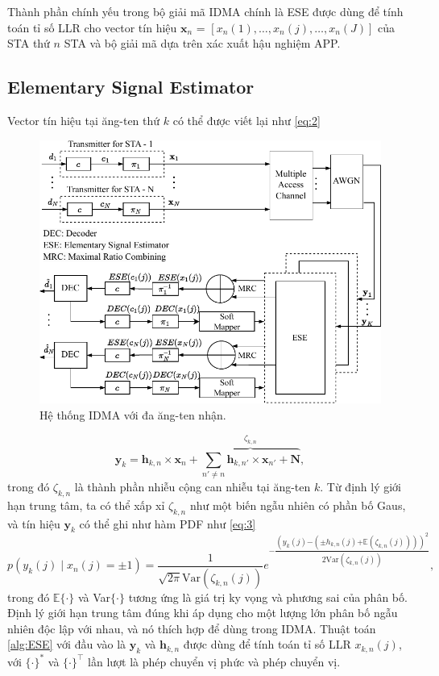 Thành phần chính yếu trong bộ giải mã IDMA chính là \acrfull{ESE} được dùng để tính toán tỉ số \acrfull{LLR} cho vector tín hiệu $\mathbf{x}_n $ = $[x_n(1),\dots,x_n(j),\dots,x_n(J)]$ của STA thứ $n$ STA và bộ giải mã dựa trên xác xuất hậu nghiệm \acrfull{APP}.

\subsection{Elementary Signal Estimator} \label{sub2.1}

Vector tín hiệu tại ăng-ten thứ $k$ có thể được viết lại như \eqref{eq:2}

\begin{figure}
    \centering
    \includegraphics[width = 0.75\linewidth]{figure/Chap2/IDMA_Tx_Rx_structure-2_k2opt.pdf}
    \caption{Hệ thống IDMA với đa ăng-ten nhận.}
    \vspace{-1em}
    \label{fig:IDMASystem}
\end{figure}

\begin{equation}
    \mathbf{y}_k = \mathbf{h}_{k,n} \times \mathbf{x}_n 
    + \overbrace{\sum_{n' \neq n}\mathbf{h}_{k,n'} \times \mathbf{x}_{n'} 
    + \mathbf{N}}^{\zeta_{k,n}},
    \label{eq:2}
\end{equation}%
trong đó $\zeta_{k,n}$ là thành phần nhiễu cộng can nhiễu tại ăng-ten $k$. Từ định lý giới hạn trung tâm, ta có thể xấp xỉ $\zeta_{k,n}$ như một biến ngẫu nhiên có phần bố Gaus, và tín hiệu $\mathbf{y}_k$ có thể ghi như hàm PDF như \eqref{eq:3}
\begin{equation}
         p(y_k(j)\mid x_n(j)=\pm 1) = 
         \frac{1}{\sqrt{2\pi}\text{Var}(\zeta_{k,n}(j))} 
        e^{\mathord{-}\dfrac{(y_k(j)\mathord{-}(\pm h_{k,n}(j)\mathord{+}\mathbb{E}(\zeta_{k,n}(j))))^2}{2\text{Var}(\zeta_{k,n}(j))}},
    \label{eq:3}
\end{equation}
trong đó $\mathbb{E}\{\cdot\}$ và Var$\{\cdot\}$ tương ứng là giá trị ky vọng và phương sai của phân bố. Định lý giới hạn trung tâm đúng khi áp dụng cho một lượng lớn phân bố ngẫu nhiên độc lập với nhau, và nó thích hợp để dùng trong IDMA. Thuật toán \ref{alg:ESE} với đầu vào là $\mathbf{y}_k$ và $\mathbf{h}_{k,n}$ được dùng để tính toán tỉ số LLR $x_{k,n}(j)$, với $\{\cdot\}^*$ và $\{\cdot\}^\top$ lần lượt là phép chuyển vị phức và phép chuyển vị.

